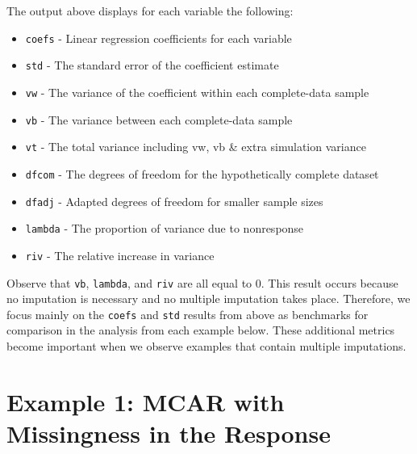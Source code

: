 \documentclass[12pt,oneside]{chicagocapstone}
\providecommand{\tightlist}{%
  \setlength{\itemsep}{0pt}\setlength{\parskip}{0pt}}
\begin{document}
The output above displays for each variable the following:
\begin{itemize}
\tightlist
\item
  \texttt{coefs} - Linear regression coefficients for each variable\\
\item
  \texttt{std} - The standard error of the coefficient estimate\\
\item
  \texttt{vw} - The variance of the coefficient within each
  complete-data sample\\
\item
  \texttt{vb} - The variance between each complete-data sample\\
\item
  \texttt{vt} - The total variance including vw, vb \& extra simulation
  variance\\
\item
  \texttt{dfcom} - The degrees of freedom for the hypothetically
  complete dataset\\
\item
  \texttt{dfadj} - Adapted degrees of freedom for smaller sample sizes\\
\item
  \texttt{lambda} - The proportion of variance due to nonresponse\\
\item
  \texttt{riv} - The relative increase in variance
\end{itemize}
Observe that \texttt{vb}, \texttt{lambda}, and \texttt{riv} are all
equal to 0. This result occurs because no imputation is necessary and no
multiple imputation takes place. Therefore, we focus mainly on the
\texttt{coefs} and \texttt{std} results from above as benchmarks for
comparison in the analysis from each example below. These additional
metrics become important when we observe examples that contain multiple
imputations.

\section*{Example 1: MCAR with Missingness in the
Response}\label{example-1-mcar-with-missingness-in-the-response}
\end{document}
